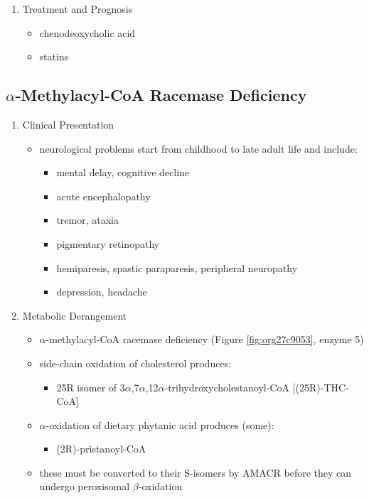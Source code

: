 \documentclass[12pt]{scrartcl}
\begin{document}
\begin{enumerate}
\item Treatment and Prognosis
\label{sec:org7da4cd0}
\begin{itemize}
\item chenodeoxycholic acid
\item statins
\end{itemize}
\end{enumerate}
\subsection{\(\alpha\)-Methylacyl-CoA Racemase Deficiency}
\label{sec:org30edf5e}
\begin{enumerate}
\item Clinical Presentation
\label{sec:orgd16e977}
\begin{itemize}
\item neurological problems start from childhood to late adult life and
include:
\begin{itemize}
\item mental delay, cognitive decline
\item acute encephalopathy
\item tremor, ataxia
\item pigmentary retinopathy
\item hemiparesis, spastic paraparesis, peripheral neuropathy
\item depression, headache
\end{itemize}
\end{itemize}

\item Metabolic Derangement
\label{sec:org6ce6a18}
\begin{itemize}
\item \(\alpha\)-methylacyl-CoA racemase deficiency (Figure \ref{fig:org27c9053}, enzyme 5)
\item side-chain oxidation of cholesterol produces:
\begin{itemize}
\item 25R isomer of 3\(\alpha\),7\(\alpha\),12\(\alpha\)-trihydroxycholestanoyl-CoA [(25R)-THC-CoA]
\end{itemize}
\item \(\alpha\)-oxidation of dietary phytanic acid produces (some):
\begin{itemize}
\item (2R)-pristanoyl-CoA
\end{itemize}
\item these must be converted to their S-isomers by AMACR before they can
undergo peroxisomal \(\beta\)-oxidation
\end{itemize}


\end{enumerate}
\end{document}
